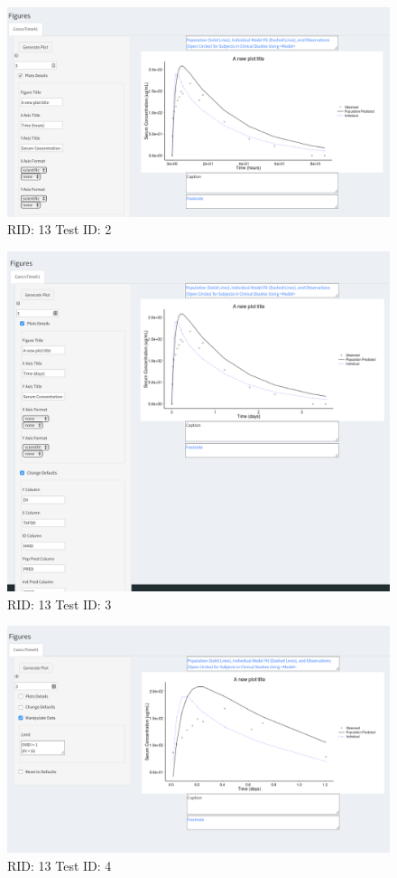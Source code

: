 \begin{figure}[H]
\includegraphics[width=.8\textwidth]{screencaps/13-2-1.png}
\caption{RID: 13 Test ID: 2}
\end{figure}
\begin{figure}[H]
\includegraphics[width=.8\textwidth]{screencaps/13-3-1.png}
\caption{RID: 13 Test ID: 3}
\end{figure}
\begin{figure}[H]
\includegraphics[width=.8\textwidth]{screencaps/13-4-1.png}
\caption{RID: 13 Test ID: 4}
\end{figure}
